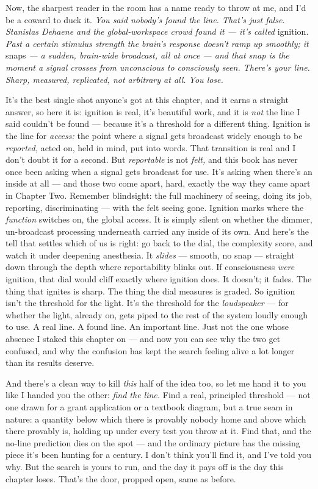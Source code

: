 \documentclass[11pt,openany]{book}
\begin{document}
Now, the sharpest reader in the room has a name ready to throw at me, and I’d be a coward to duck it. \textit{You said nobody’s found the line. That’s just false. Stanislas Dehaene and the global-workspace crowd found it — it’s called} ignition. \textit{Past a certain stimulus strength the brain’s response doesn’t ramp up smoothly; it} snaps \textit{— a sudden, brain-wide broadcast, all at once — and that snap is the moment a signal crosses from unconscious to consciously seen. There’s your line. Sharp, measured, replicated, not arbitrary at all. You lose.}

It’s the best single shot anyone’s got at this chapter, and it earns a straight answer, so here it is: ignition is real, it’s beautiful work, and it is \textit{not} the line I said couldn’t be found — because it’s a threshold for a different thing. Ignition is the line for \textit{access:} the point where a signal gets broadcast widely enough to be \textit{reported,} acted on, held in mind, put into words. That transition is real and I don’t doubt it for a second. But \textit{reportable} is not \textit{felt,} and this book has never once been asking when a signal gets broadcast for use. It’s asking when there’s an inside at all — and those two come apart, hard, exactly the way they came apart in Chapter Two. Remember blindsight: the full machinery of seeing, doing its job, reporting, discriminating — with the felt seeing gone. Ignition marks where the \textit{function} switches on, the global access. It is simply silent on whether the dimmer, un-broadcast processing underneath carried any inside of its own. And here’s the tell that settles which of us is right: go back to the dial, the complexity score, and watch it under deepening anesthesia. It \textit{slides} — smooth, no snap — straight down through the depth where reportability blinks out. If consciousness \textit{were} ignition, that dial would cliff exactly where ignition does. It doesn’t; it fades. The thing that ignites is sharp. The thing the dial measures is graded. So ignition isn’t the threshold for the light. It’s the threshold for the \textit{loudspeaker} — for whether the light, already on, gets piped to the rest of the system loudly enough to use. A real line. A found line. An important line. Just not the one whose absence I staked this chapter on — and now you can see why the two get confused, and why the confusion has kept the search feeling alive a lot longer than its results deserve.

And there’s a clean way to kill \textit{this} half of the idea too, so let me hand it to you like I handed you the other: \textit{find the line.} Find a real, principled threshold — not one drawn for a grant application or a textbook diagram, but a true seam in nature: a quantity below which there is provably nobody home and above which there provably is, holding up under every test you throw at it. Find that, and the no-line prediction dies on the spot — and the ordinary picture has the missing piece it’s been hunting for a century. I don’t think you’ll find it, and I’ve told you why. But the search is yours to run, and the day it pays off is the day this chapter loses. That’s the door, propped open, same as before.
\end{document}
